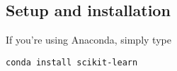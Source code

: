 \documentclass[SKL-MASTER.tex]{subfiles}
\begin{document}
\Large
\subsection*{Setup and installation}

If you're using Anaconda, simply type

\begin{framed}
\begin{verbatim}
conda install scikit-learn
\end{verbatim}
\end{framed}

\end{document}
